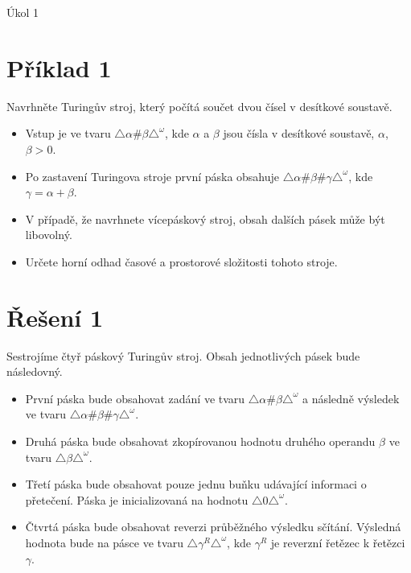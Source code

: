 \documentclass[a4paper, 11pt, fleqn]{scrartcl}
\newcommand{\NAZEV}{Úkol 1}
\begin{document}
 \begin{center}
   {\Large \NAZEV}
 \end{center}


 \section*{Příklad 1}
   Navrhněte Turingův stroj, který počítá součet dvou čísel v desítkové soustavě.

   \begin{itemize}\setlength\itemsep{-0.5em}
     \item Vstup je ve tvaru $\triangle\alpha \#\beta\triangle^\omega$, kde $\alpha$ a $\beta$ jsou čísla v desítkové soustavě, $\alpha$, $\beta > 0$.
     \item Po zastavení Turingova stroje první páska obsahuje $\triangle\alpha\#\beta\#\gamma\triangle^\omega$, kde $\gamma = \alpha + \beta$.
     \item V případě, že navrhnete vícepáskový stroj, obsah dalších pásek může být libovolný.
     \item Určete horní odhad časové a prostorové složitosti tohoto stroje.
   \end{itemize}

 \section*{Řešení 1}
   Sestrojíme čtyř páskový Turingův stroj. Obsah jednotlivých pásek bude následovný.

   \begin{itemize}\setlength\itemsep{-0.1em}
     \item První páska bude obsahovat zadání ve tvaru $\triangle\alpha \#\beta\triangle^\omega$ a následně výsledek ve tvaru $\triangle\alpha\#\beta\#\gamma\triangle^\omega$.
     \item Druhá páska bude obsahovat zkopírovanou hodnotu druhého operandu $\beta$ ve tvaru $\triangle\beta\triangle^\omega$.
     \item Třetí páska bude obsahovat pouze jednu buňku udávající informaci o přetečení. Páska je inicializovaná na hodnotu $\triangle 0 \triangle^\omega$.
     \item Čtvrtá páska bude obsahovat reverzi průběžného výsledku sčítání. Výsledná hodnota bude na pásce ve tvaru $\triangle\gamma^R\triangle^\omega$, kde $\gamma^R$ je reverzní řetězec k řetězci $\gamma$.
   \end{itemize}
\end{document}
